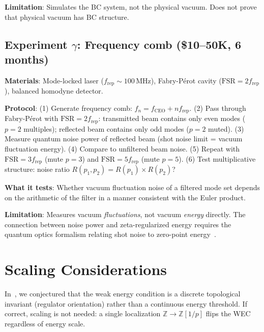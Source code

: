 \documentclass[11pt,a4paper]{article}
\newcommand{\Zp}{\mathbb{Z}[1/p]}
\begin{document}
\textbf{Limitation}: Simulates the BC system, not the
physical vacuum. Does not prove that physical vacuum
has BC structure.

\subsection{Experiment $\gamma$: Frequency comb (\$10--50K, 6 months)}

\textbf{Materials}: Mode-locked laser ($f_{\mathrm{rep}} \sim 100$\,MHz),
Fabry-P\'erot cavity ($\mathrm{FSR} = 2 f_{\mathrm{rep}}$),
balanced homodyne detector.

\textbf{Protocol}:
(1) Generate frequency comb: $f_n = f_{\mathrm{CEO}} + n f_{\mathrm{rep}}$.
(2) Pass through Fabry-P\'erot with $\mathrm{FSR} = 2 f_{\mathrm{rep}}$:
transmitted beam contains only even modes ($p = 2$ multiples);
reflected beam contains only odd modes ($p = 2$ muted).
(3) Measure quantum noise power of reflected beam
(shot noise limit = vacuum fluctuation energy).
(4) Compare to unfiltered beam noise.
(5) Repeat with $\mathrm{FSR} = 3 f_{\mathrm{rep}}$ (mute $p = 3$)
and $\mathrm{FSR} = 5 f_{\mathrm{rep}}$ (mute $p = 5$).
(6) Test multiplicative structure:
noise ratio $R(p_1, p_2) = R(p_1) \times R(p_2)$?

\textbf{What it tests}: Whether vacuum fluctuation noise of
a filtered mode set depends on the arithmetic of the
filter in a manner consistent with the Euler product.

\textbf{Limitation}: Measures vacuum \emph{fluctuations},
not vacuum \emph{energy} directly. The connection between
noise power and zeta-regularized energy requires the
quantum optics formalism relating shot noise to zero-point
energy~\cite{Caves1981}.

\section{Scaling Considerations}
\label{sec:scaling}

In~\cite{paper_B}, we conjectured that the weak energy condition
is a discrete topological invariant (regulator orientation)
rather than a continuous energy threshold. If correct, scaling
is not needed: a single localization $\mathbb{Z} \to \Zp$
flips the WEC regardless of energy scale.
\end{document}
